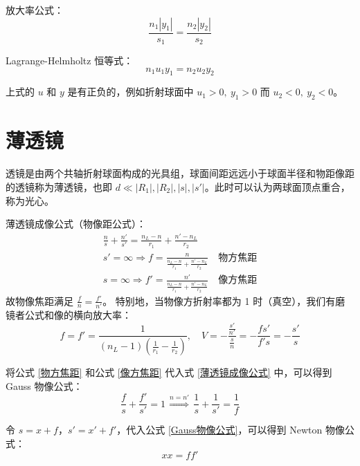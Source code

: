 \documentclass[UTF8]{report}
\theoremstyle{MyLineTheoremStyle} %
\theoremstyle{MyBlockTheoremStyle} %
\theoremstyle{MySubsubsectionStyle} %
\begin{document}
放大率公式：
\begin{equation}
\frac{n_1 | y_1 |}{s_1} = \frac{n_2 | y_2 |}{s_2}
\end{equation}

Lagrange-Helmholtz 恒等式：
\begin{equation}
n_1u_1y_1 = n_2u_2y_2
\end{equation}

上式的 $u$ 和 $y$ 是有正负的，例如折射球面中 $u_1 > 0,\ y_1 >0$ 而 $u_2 <0,\ y_2 < 0$。







\section{薄透镜}

透镜是由两个共轴折射球面构成的光具组，球面间距远远小于球面半径和物距像距的透镜称为薄透镜，也即 $d \ll | R_1 |, | R_2 |, | s |, | s' |$。此时可以认为两球面顶点重合，称为光心。

薄透镜成像公式（物像距公式）：
\begin{gather} 
\frac{n}{s} + \frac{n'}{s'} = \frac{n_L - n}{r_1} + \frac{n' - n_L}{r_2} \label{薄透镜成像公式} \\
s' = \infty \Longrightarrow  f = \frac{n}{\frac{n_L - n}{r_1} + \frac{n' - n_L}{r_2}}\quad \text{物方焦距} \label{物方焦距} \\ 
s = \infty \Longrightarrow  f' = \frac{n'}{\frac{n_L - n}{r_1} + \frac{n' - n_L}{r_2}}\quad \text{像方焦距} \label{像方焦距}
\end{gather}
故物像焦距满足 $\frac{f}{n} = \frac{f'}{n'}$。
特别地，当物像方折射率都为 1 时（真空），我们有磨镜者公式和像的横向放大率：
\begin{equation}
f =f' = \frac{1}{(n_L - 1)(\frac{1}{r_1} - \frac{1}{r_2})},\quad  V = -\frac{\frac{s'}{n'}}{\frac{s}{n}} = -\frac{fs'}{f's} =  - \frac{s'}{s}
\end{equation}


将公式 \ref{物方焦距} 和公式 \ref{像方焦距} 代入式 \ref{薄透镜成像公式} 中，可以得到 Gauss 物像公式：
\begin{equation}
\frac{f}{s} + \frac{f'}{s'} = 1 \overset{n = n'}{\ \ \ \Longrightarrow\ \ \  } \frac{1}{s} + \frac{1}{s'} = \frac{1}{f}
\label{Gauss物像公式}
\end{equation}

令 $s = x + f$，$s' = x' + f'$，代入公式 \ref{Gauss物像公式}，可以得到 Newton 物像公式：
\begin{equation}
xx = ff'
\end{equation}
\end{document}
